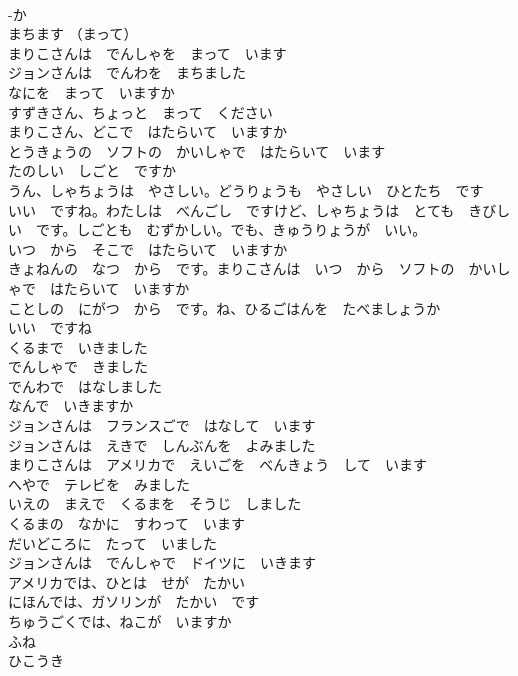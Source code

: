 \documentclass[8pt]{extreport}
\begin{document}
\begin{CJK}{UTF8}{min}
\\	-か	
\\	まちます （まって）	
\\	まりこさんは　でんしゃを　まって　います	
\\	ジョンさんは　でんわを　まちました	
\\	なにを　まって　いますか	
\\	すずきさん、ちょっと　まって　ください	
\\	まりこさん、どこで　はたらいて　いますか	
\\	とうきょうの　ソフトの　かいしゃで　はたらいて　います	
\\	たのしい　しごと　ですか	
\\	うん、しゃちょうは　やさしい。どうりょうも　やさしい　ひとたち　です	
\\	いい　ですね。わたしは　べんごし　ですけど、しゃちょうは　とても　きびしい　です。しごとも　むずかしい。でも、きゅうりょうが　いい。	
\\	いつ　から　そこで　はたらいて　いますか	
\\	きょねんの　なつ　から　です。まりこさんは　いつ　から　ソフトの　かいしゃで　はたらいて　いますか	
\\	ことしの　にがつ　から　です。ね、ひるごはんを　たべましょうか	
\\	いい　ですね	
\\	くるまで　いきました	
\\	でんしゃで　きました	
\\	でんわで　はなしました	
\\	なんで　いきますか	
\\	ジョンさんは　フランスごで　はなして　います	
\\	ジョンさんは　えきで　しんぶんを　よみました	
\\	まりこさんは　アメリカで　えいごを　べんきょう　して　います	
\\	へやで　テレビを　みました	
\\	いえの　まえで　くるまを　そうじ　しました	
\\	くるまの　なかに　すわって　います	
\\	だいどころに　たって　いました	
\\	ジョンさんは　でんしゃで　ドイツに　いきます	
\\	アメリカでは、ひとは　せが　たかい	
\\	にほんでは、ガソリンが　たかい　です	
\\	ちゅうごくでは、ねこが　いますか	
\\	ふね	
\\	ひこうき	

\end{CJK}
\end{document}

